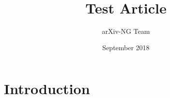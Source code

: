 \documentclass{article}
\title{Test Article}
\author{arXiv-NG Team}
\date{September 2018}
\begin{document}
\maketitle

\section{Introduction}
\end{document}
